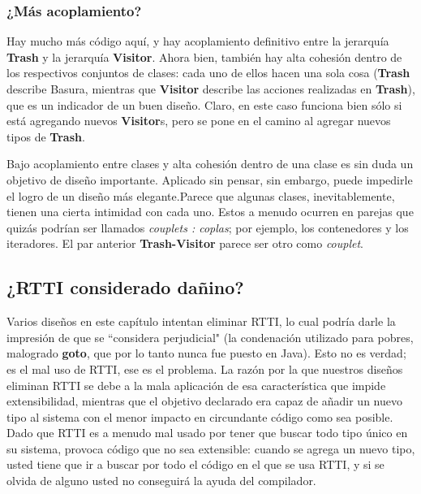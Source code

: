 \subsubsection*{¿Más acoplamiento?}
\label{subsubsec:moreA}


Hay mucho más código aquí, y hay acoplamiento definitivo entre la jerarquía \textbf{Trash} y la jerarquía \textbf{Visitor}. Ahora bien, también hay alta cohesión dentro de los respectivos conjuntos de clases: cada uno de ellos hacen una sola cosa (\textbf{Trash} describe Basura, mientras que \textbf{Visitor} describe las acciones realizadas en \textbf{Trash}), que es un indicador de un buen diseño. Claro, en este caso funciona bien sólo si está agregando nuevos \textbf{Visitor}s, pero se pone en el camino al agregar nuevos tipos de \textbf{Trash}.          \newline

Bajo acoplamiento entre clases y alta cohesión dentro de una clase es sin duda un objetivo de diseño importante. Aplicado sin pensar, sin embargo, puede impedirle el logro de un diseño más elegante.Parece que algunas clases, inevitablemente, tienen una cierta intimidad con cada uno. Estos a menudo ocurren en parejas que quizás podrían ser llamados \textit{couplets : coplas}; por ejemplo, los contenedores y los iteradores. El par anterior \textbf{Trash-Visitor} parece ser otro como \textit{couplet}.    \newline

\subsection*{¿RTTI considerado dañino?}
\label{subsec:rtticd}

Varios diseños en este capítulo intentan eliminar RTTI, lo cual podría darle la impresión de que se “considera perjudicial" (la condenación utilizado para pobres, malogrado \textbf{goto}, que por lo tanto nunca fue puesto en Java). Esto no es verdad; es el mal uso de RTTI, ese es el problema. La razón por la que nuestros diseños eliminan RTTI se debe a la mala aplicación de esa característica que impide extensibilidad, mientras que el objetivo declarado era capaz de añadir un nuevo tipo al sistema con el menor impacto en circundante código como sea posible. Dado que RTTI es a menudo mal usado por tener que buscar todo tipo único en su sistema, provoca código que no sea extensible: cuando se agrega un nuevo tipo, usted tiene que ir a buscar por todo el código en el que se usa RTTI, y si se olvida de alguno usted no conseguirá la ayuda del compilador.     \newline

